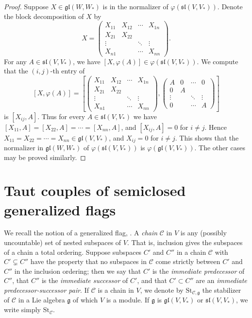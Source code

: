 \documentclass{article}
\newcommand {\St} {\mathrm{St}}
\def\gl{\mathfrak {gl}}
\def\g{\mathfrak {g}}
\def\sl{\mathfrak{sl}}
\def\Ch{\mathcal{C}}
\begin{document}
\begin{proof}
Suppose $X \in \gl(W,W_*)$ is in the normalizer of $\varphi (\sl(V,V_*))$.  Denote the block decomposition of $X$ by
$$X = \left( \begin{array}{cccc}
X_{11} & X_{12} & \cdots & X_{1n} \\
X_{21} & X_{22} & &\\
\vdots & & \ddots & \vdots \\
X_{n1} & & \cdots & X_{nn}
\end{array} \right) .$$
For any $A \in \sl(V,V_*)$, we have $[X,\varphi(A)] \in \varphi(\sl(V,V_*))$.  We compute that the $(i,j)$-th entry of
$$[X, \varphi(A)] = 
\left[
\left( \begin{array}{cccc}
X_{11} & X_{12} & \cdots & X_{1n} \\
X_{21} & X_{22} & &\\
\vdots & & \ddots & \vdots \\
X_{n1} & & \cdots & X_{nn}
\end{array} \right)
,
\left( \begin{array}{cccc}
A & 0 & \cdots & 0 \\
0 & A & &\\
\vdots & & \ddots & \vdots \\
0 & & \cdots & A
\end{array} \right)
\right]$$
is $[X_{ij} , A]$.  Thus for every $A \in \sl(V,V_*)$ we have $[X_{11} , A] = [X_{22}, A] = \cdots = [X_{nn} , A]$, and $[X_{ij},A] = 0$ for $i \neq j$.  Hence $X_{11} = X_{22} = \cdots = X_{nn} \in \gl(V,V_*)$, and $X_{ij} = 0$ for $i \neq j$.  This shows that the normalizer in $\gl(W,W_*)$ of $\varphi (\sl(V,V_*))$ is $\varphi (\gl(V,V_*))$.  The other cases may be proved similarly.
\end{proof}


\section{Taut couples of semiclosed generalized flags} \label{tautcouples}


We recall the notion of a generalized flag, \cite{DP1}. A \emph{chain} $\Ch$ in $V$ is any (possibly uncountable) set of nested subspaces of $V$.  That is, inclusion gives the subspaces of a chain a total ordering.  Suppose subspaces $C'$ and $C''$ in a chain $\Ch$ with $C' \subsetneq C''$ have the property that no subspaces in $\Ch$ come strictly between $C'$ and $C''$ in the inclusion ordering; then we say that $C'$ is the \emph{immediate predecessor} of $C''$, that $C''$ is the \emph{immediate successor} of $C'$, and that $C' \subset C''$ are an \emph{immediate predecessor-successor pair}.   If $\Ch$ is a chain in $V$, we denote by $\St_{\Ch,\g}$ the stabilizer of $\Ch$ in a Lie algebra $\g$ of which $V$ is a module.  If $\g$ is $\gl(V,V_*)$ or $\sl(V,V_*)$, we write simply $\St_\Ch$.
\end{document}
